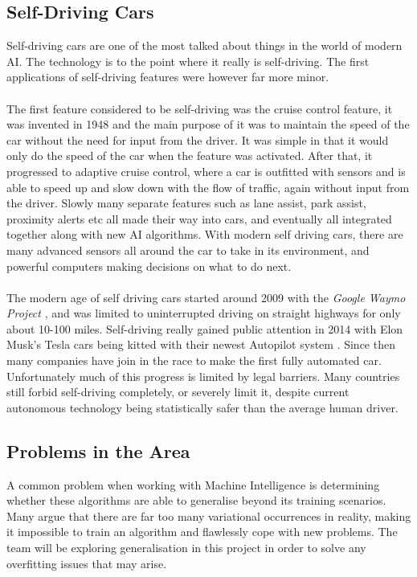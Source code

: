 \documentclass[8pt]{article}
\begin{document}
\subsection{Self-Driving Cars}
Self-driving cars are one of the most talked about things in the world of modern AI. The technology is to the point where it really is self-driving. The first applications of self-driving features were however far more minor.
\\\\
The first feature considered to be self-driving was the cruise control feature, it was invented in 1948 \cite{CruiseControl} and the main purpose of it was to maintain the speed of the car without the need for input from the driver. It was simple in that it would only do the speed of the car when the feature was activated. After that, it progressed to adaptive cruise control, where a car is outfitted with sensors and is able to speed up and slow down with the flow of traffic, again without input from the driver. Slowly many separate features such as lane assist, park assist, proximity alerts etc all made their way into cars, and eventually all integrated together along with new AI algorithms. With modern self driving cars, there are many advanced sensors all around the car to take in its environment, and powerful computers making decisions on what to do next. 
\\\\
The modern age of self driving cars started around 2009 with the \emph{Google Waymo Project} \cite{WaymoProject}, and was limited to uninterrupted driving on straight highways for only about 10-100 miles. Self-driving really gained public attention in 2014 with Elon Musk’s Tesla cars being kitted with their newest Autopilot system \cite{TelstraAutopilot}. Since then many companies have join in the race to make the first fully automated car. Unfortunately much of this progress is limited by legal barriers. Many countries still forbid self-driving completely, or severely limit it, despite current autonomous technology being statistically safer than the average human driver.


\subsection{Problems in the Area}
A common problem when working with Machine Intelligence is determining whether these algorithms are able to generalise beyond its training scenarios. Many argue that there are far too many variational occurrences in reality, making it impossible to train an algorithm and flawlessly cope with new problems. The team will be exploring generalisation in this project in order to solve any overfitting issues that may arise. 
\end{document}
